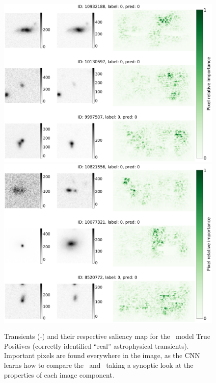 \begin{figure}
    \centering
    \includegraphics[width=0.8\linewidth]{
    figures/saliency_plot_other3nodiaTP-see766.pdf}
    \includegraphics[width=0.8\linewidth]{
    figures/saliency_plot_other3nodiaTP-see7407.pdf}
   \caption{Transients (\search-\temp) and their respective saliency map for the \nodia\ model True Positives  (correctly identified ``real'' astrophysical transients). Important pixels are found everywhere in the image, as the CNN learns how to compare the \diff\ and \temp\ taking a synoptic look at the properties of each image component.}
    \label{fig:tpndia}
\end{figure}

